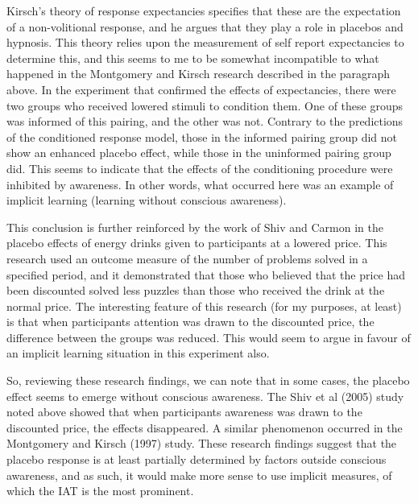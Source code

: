 Kirsch's \cite{Kirsch1985,Kirsch1997} theory of response expectancies specifies that these are the expectation of a non-volitional response, and he argues that they play a role in placebos and hypnosis. This theory  relies upon the measurement of self report expectancies to determine this, and this seems to me to be somewhat incompatible to what happened in the Montgomery and Kirsch research described in the paragraph above. In the experiment that confirmed the effects of expectancies, there were two groups who received lowered stimuli to condition them. One of these groups was informed of this pairing, and the other was not. Contrary to the predictions of the conditioned response model, those in the informed pairing group did not show an enhanced placebo effect, while those in the uninformed pairing group did. This seems to indicate that the effects of the conditioning procedure were inhibited by awareness. In other words, what occurred here was an example of implicit learning (learning without conscious awareness).

This conclusion is further reinforced by the work of Shiv and Carmon \cite{Shiv2005a} in the placebo effects of energy drinks given to participants at a lowered price. This research used an outcome measure of the number of problems solved in a specified period, and it demonstrated that those who believed that the price had been discounted solved less puzzles than those who received the drink at the normal price. The interesting feature of this research (for my purposes, at least) is that when participants attention was drawn to the discounted price, the difference between the groups was reduced. This would seem to argue in favour of an implicit learning situation in this experiment also. 

So, reviewing these research findings, we can note that in some cases, the placebo effect seems to emerge without conscious awareness. The Shiv et al (2005) study noted above showed that when participants awareness was drawn to the discounted price, the effects disappeared. A similar phenomenon occurred in the Montgomery and Kirsch (1997) study. These research findings suggest that the placebo response is at least partially determined by factors outside conscious awareness, and as such, it would make more sense to use implicit measures, of which the IAT is the most prominent. 

